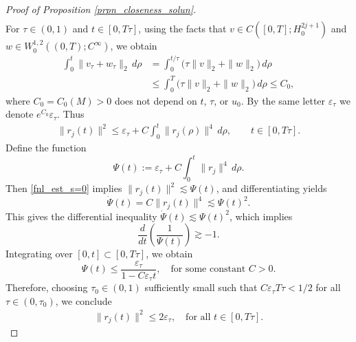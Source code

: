 \documentclass[10pt, reqno]{amsart}
\numberwithin{equation}{section}
\begin{document}
\begin{proof}[Proof of Proposition \ref{prpn_closeness_solun}]
\begin{align*}
\end{align*}
For $\tau \in (0,1)$ and $t \in [0,T\tau]$, using the facts that 
$v \in C([0,T]; H_0^{2j+1})$ and $w \in W^{1,2}_0((0,T); C^\infty)$, we obtain
\begin{align*}
	\int_{0}^{t} \| v_{\tau} + w_{\tau} \|_{2}\, d\rho
	&= \int_{0}^{t/\tau} \bigl(\tau \| v \|_{2} + \| w \|_{2}\bigr)\, d\rho \\
	&\le \int_{0}^{T} \bigl(\tau \| v \|_{2} + \| w \|_{2}\bigr)\, d\rho 
	\le C_0 ,
\end{align*}
where $C_0 = C_0(M) > 0$ does not depend on $t$, $\tau$, or $u_0$. 
By the same letter $\varepsilon_{\tau}$ we denote $e^{C_0}\varepsilon_{\tau}$. 
Thus
\begin{align}\label{fnl_est_s=0}
	\| r_j(t) \|^2 \le \varepsilon_{\tau} + C \int_0^t \| r_j(\rho) \|^4 \, d\rho, 
	\qquad t \in [0, T\tau].
\end{align}
Define the function
\[
\Psi(t) := \varepsilon_{\tau} + C \int_0^t \| r_j \|^4 \, d\rho.
\]
Then \eqref{fnl_est_s=0} implies \( \| r_j(t) \|^2 \lesssim \Psi(t) \), and differentiating yields
\[
\dot{\Psi}(t) = C \| r_j(t) \|^4 \lesssim \Psi(t)^2.
\]
This gives the differential inequality \( \dot{\Psi}(t) \lesssim \Psi(t)^2 \), which implies
\[
\frac{d}{dt} \left( \frac{1}{\Psi(t)} \right) \gtrsim -1.
\]
Integrating over \( [0, t] \subset [0, T\tau] \), we obtain
\[
\Psi(t) \le \frac{\varepsilon_{\tau}}{1 - C \varepsilon_{\tau} t}, \quad \text{for some constant } C > 0.
\]
Therefore, choosing \( \tau_0 \in (0, 1) \) sufficiently small such that \( C \varepsilon_{\tau} T\tau < 1/2 \) for all \( \tau \in (0, \tau_0) \), we conclude
\begin{align} \label{L^2_bound_of_r}
	\| r_j(t) \|^2 \leq 2 \varepsilon_{\tau}, \quad \text{for all } t \in [0, T\tau].
\end{align}



\end{proof}
\end{document}
